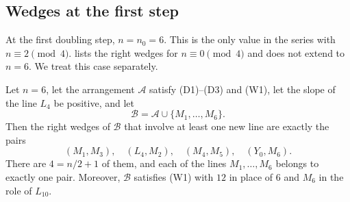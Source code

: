 \subsection{Wedges at the first step}

At the first doubling step, $n=n_0=6$. This is the only value in the series with $n\equiv2\pmod4$.
 lists the right wedges for $n\equiv0\pmod4$ and does not extend to $n=6$.
We treat this case separately.

\begin{lemma}\label{lem:first-step}
Let $n=6$, let the arrangement $\mathcal A$ satisfy \textup{(D1)--(D3)} and \textup{(W1)}, let the slope of the line $L_4$ be positive, and let
\[
\mathcal B=\mathcal A\cup\{M_1,\ldots,M_6\}.
\]
Then the right wedges of $\mathcal B$ that involve at least one new line are exactly the pairs
\begin{equation}\label{eq:wedges-first-step}
(M_1,M_3),\quad (L_4,M_2),\quad (M_4,M_5),\quad (Y_0,M_6).
\end{equation}
There are $4=n/2+1$ of them, and each of the lines $M_1,\ldots,M_6$ belongs to exactly one pair.
Moreover, $\mathcal B$ satisfies \textup{(W1)} with $12$ in place of $6$ and $M_6$ in the role of $L_{10}$.
\end{lemma}

